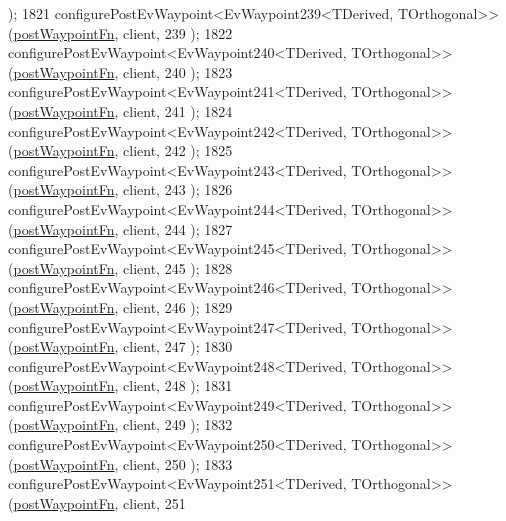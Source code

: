 \begin{DoxyCode}
      );
1821     configurePostEvWaypoint<EvWaypoint239<TDerived, TOrthogonal>>(\hyperlink{classcl__move__base__z_1_1WaypointEventDispatcher_a964a57fcce5d48ec60243230722d8dd7}{postWaypointFn}, client, 239
      );
1822     configurePostEvWaypoint<EvWaypoint240<TDerived, TOrthogonal>>(\hyperlink{classcl__move__base__z_1_1WaypointEventDispatcher_a964a57fcce5d48ec60243230722d8dd7}{postWaypointFn}, client, 240
      );
1823     configurePostEvWaypoint<EvWaypoint241<TDerived, TOrthogonal>>(\hyperlink{classcl__move__base__z_1_1WaypointEventDispatcher_a964a57fcce5d48ec60243230722d8dd7}{postWaypointFn}, client, 241
      );
1824     configurePostEvWaypoint<EvWaypoint242<TDerived, TOrthogonal>>(\hyperlink{classcl__move__base__z_1_1WaypointEventDispatcher_a964a57fcce5d48ec60243230722d8dd7}{postWaypointFn}, client, 242
      );
1825     configurePostEvWaypoint<EvWaypoint243<TDerived, TOrthogonal>>(\hyperlink{classcl__move__base__z_1_1WaypointEventDispatcher_a964a57fcce5d48ec60243230722d8dd7}{postWaypointFn}, client, 243
      );
1826     configurePostEvWaypoint<EvWaypoint244<TDerived, TOrthogonal>>(\hyperlink{classcl__move__base__z_1_1WaypointEventDispatcher_a964a57fcce5d48ec60243230722d8dd7}{postWaypointFn}, client, 244
      );
1827     configurePostEvWaypoint<EvWaypoint245<TDerived, TOrthogonal>>(\hyperlink{classcl__move__base__z_1_1WaypointEventDispatcher_a964a57fcce5d48ec60243230722d8dd7}{postWaypointFn}, client, 245
      );
1828     configurePostEvWaypoint<EvWaypoint246<TDerived, TOrthogonal>>(\hyperlink{classcl__move__base__z_1_1WaypointEventDispatcher_a964a57fcce5d48ec60243230722d8dd7}{postWaypointFn}, client, 246
      );
1829     configurePostEvWaypoint<EvWaypoint247<TDerived, TOrthogonal>>(\hyperlink{classcl__move__base__z_1_1WaypointEventDispatcher_a964a57fcce5d48ec60243230722d8dd7}{postWaypointFn}, client, 247
      );
1830     configurePostEvWaypoint<EvWaypoint248<TDerived, TOrthogonal>>(\hyperlink{classcl__move__base__z_1_1WaypointEventDispatcher_a964a57fcce5d48ec60243230722d8dd7}{postWaypointFn}, client, 248
      );
1831     configurePostEvWaypoint<EvWaypoint249<TDerived, TOrthogonal>>(\hyperlink{classcl__move__base__z_1_1WaypointEventDispatcher_a964a57fcce5d48ec60243230722d8dd7}{postWaypointFn}, client, 249
      );
1832     configurePostEvWaypoint<EvWaypoint250<TDerived, TOrthogonal>>(\hyperlink{classcl__move__base__z_1_1WaypointEventDispatcher_a964a57fcce5d48ec60243230722d8dd7}{postWaypointFn}, client, 250
      );
1833     configurePostEvWaypoint<EvWaypoint251<TDerived, TOrthogonal>>(\hyperlink{classcl__move__base__z_1_1WaypointEventDispatcher_a964a57fcce5d48ec60243230722d8dd7}{postWaypointFn}, client, 251

\end{DoxyCode}
